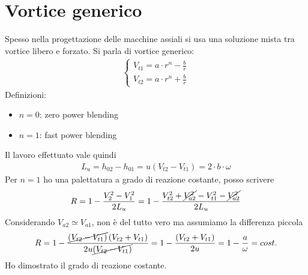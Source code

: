 \section{Vortice generico}
Spesso nella progettazione delle macchine assiali si usa una soluzione mista tra vortice libero e forzato. Si parla di vortice generico:
\begin{align*}
\begin{cases}
V_{t1} = a \cdot r^n - \frac{b}{r}\\
V_{t2} = a \cdot r^n + \frac{b}{r}
\end{cases}
\end{align*}
Definizioni:
\begin{itemize}
\item $n=0$: zero power blending
\item $n=1$: fast power blending
\end{itemize}
Il lavoro effettuato vale quindi 
\begin{align*}
L_u = h_{02} - h_{01} = u \left( V_{t2} - V_{t1} \right) = 2 \cdot b \cdot \omega
\end{align*}
Per $n=1$ ho una palettatura a grado di reazione costante, posso scrivere
\begin{align*}
R = 1 - \frac{V_2^2 - V_1^2}{2 L_u} = 1 - \frac{V_{t2}^2 + \cancel{V_{a2}^2} - V_{t1}^2 - \cancel{V_{a2}^2}}{2 L_u}
\end{align*}
Considerando $V_{a2} \simeq V_{a1}$, non è del tutto vero ma assumiamo la differenza piccola
\begin{align*}
R = 1 - \frac{\cancel{\left( V_{t2} - V_{t1} \right)} \left( V_{t2}+ V_{t1} \right)}{2 u \cancel{\left( V_{t2}- V_{t1} \right)}} = 1- \frac{\left( V_{t2}+ V_{t1} \right)}{2 u} = 1-\frac{a}{\omega} = cost.
\end{align*}
Ho dimostrato il grado di reazione costante.

